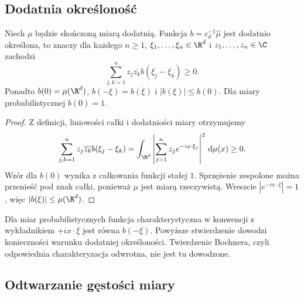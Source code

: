 \subsection{Dodatnia określoność}

\begin{stwierdzenie}
\label{prop:dt-fourier-measure-positive-definite}
Niech $\mu$ będzie skończoną miarą dodatnią.
Funkcja $b=c_d^{-1}\widehat\mu$ jest dodatnio określona,
to znaczy dla każdego $n\ge1$, $\xi_1,\ldots,\xi_n\in\R^d$
i $z_1,\ldots,z_n\in\C$ zachodzi
\[
 \sum_{j,k=1}^n z_j\overline{z_k}b(\xi_j-\xi_k)\ge0.
\]
Ponadto $b(0)=\mu(\R^d)$, $b(-\xi)=\overline{b(\xi)}$
i $|b(\xi)|\le b(0)$.
Dla miary probabilistycznej $b(0)=1$.
\end{stwierdzenie}
\begin{proof}
Z definicji, liniowości całki i dodatniości miary
otrzymujemy
\[
 \sum_{j,k=1}^n z_j\overline{z_k}b(\xi_j-\xi_k)
 =\int_{\R^d}\left|\sum_{j=1}^nz_je^{-ix\cdot\xi_j}\right|^2
 \,\mathrm d\mu(x)\ge0.
\]
Wzór dla $b(0)$ wynika z całkowania funkcji stałej $1$.
Sprzężenie zespolone można przenieść pod znak całki,
ponieważ $\mu$ jest miarą rzeczywistą.
Wreszcie $|e^{-ix\cdot\xi}|=1$, więc
$|b(\xi)|\le\mu(\R^d)$.
\end{proof}

Dla miar probabilistycznych funkcja charakterystyczna
w konwencji z wykładnikiem $+ix\cdot\xi$ jest równa
$b(-\xi)$. Powyższe stwierdzenie dowodzi konieczności
warunku dodatniej określoności. Twierdzenie Bochnera,
czyli odpowiednia charakteryzacja odwrotna, nie jest
tu dowodzone.

\subsection{Odtwarzanie gęstości miary}

